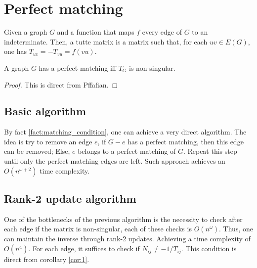 \chapter{Perfect matching}

\begin{definition}[Indeterminates]

\end{definition}

\begin{definition}
    Given a graph \(G\) and a function that maps \(f\) every edge of \(G\) to an indeterminate.
    Then, a tutte matrix is a matrix such that, for each \(uv \in E(G)\), one has \(T_{uv} = -T_{vu} = f(vu)\).
\end{definition}

\begin{fact}
    \label{fact:matching_condition}
    A graph \(G\) has a perfect matching iff \(T_G\) is non-singular.
\end{fact}

\begin{proof}
    This is direct from Pffafian.
\end{proof}

\section{Basic algorithm}

By fact \ref{fact:matching_condition}, one can achieve a very direct algorithm.
The idea is try to remove an edge \(e\), if \(G - e\) has a perfect matching, 
then this edge can be removed; Else, \(e\) belongs to a perfect matching of \(G\).
Repeat this step until only the perfect matching edges are left.
Such approach achieves an \(O(n^{\omega + 2})\) time complexity.

\section{Rank-2 update algorithm}

One of the bottlenecks of the previous algorithm is the necessity to check after each
edge if the matrix is non-singular, each of these checks is \(O(n^{\omega})\).
Thus, one can maintain the inverse through rank-2 updates.
Achieving a time complexity of \(O(n^{4})\).
For each edge, it suffices to check if \(N_{ij} \neq -1/T_{ij}\).
This condition is direct from corollary \ref{cor:1}.